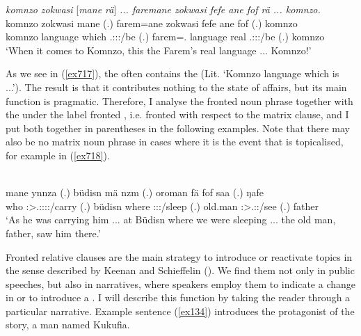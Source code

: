\begin{exe}
	\ex \emph{komnzo zokwasi} [\emph{mane rä}] \emph{... faremane zokwasi fefe ane fof rä ... komnzo.}\\
	\gll komnzo zokwasi mane  (.) farem=ane zokwasi fefe ane fof  (.) komnzo\\
	komnzo language which \Tsg.\F:\Sbj:\Nonpast:\Ipfv/be (.) farem=\Poss.\Sg{} language real \Dem{} \Emph{} \Tsg.\F:\Sbj:\Nonpast:\Ipfv/be (.) komnzo\\
	\trans `When it comes to Komnzo, this the Farem's real language ... Komnzo!'\\
	\label{ex717}
\end{exe}

As we see in (\ref{ex717}), the  often contains the  (Lit. `Komnzo language which is ...'). The result is that it contributes nothing to the state of affairs, but its main function is pragmatic. Therefore, I analyse the fronted noun phrase together with the  under the label fronted , i.e. fronted with respect to the matrix clause, and I put both together in parentheses in the following examples. Note that there may also be no matrix noun phrase in cases where it is the event that is topicalised, for example in (\ref{ex718}).

\begin{exe}
	\\
	\gll mane ynnza (.) büdisn mä nzm (.) oroman fä fof saa (.) ŋafe\\
	who \Sg:\Sbj>\Tsg.\Masc:\Obj:\Pst:\Ipfv:\Venit/carry (.) büdisn where \Fpl:\Sbj:\Pst:\Dur/sleep (.) old.man \Dist{} \Emph{} \Sg:\Sbj>\Tsg.\Masc:\Pst:\Ipfv/see (.) father\\
	\trans `As he was carrying him ... at Büdisn where we were sleeping ... the old man, father, saw him there.'
	\label{ex718}
\end{exe}

Fronted relative clauses are the main strategy to introduce or reactivate topics in the sense described by Keenan and Schieffelin (\citeyear[342]{Keenan:1976wo}). We find them not only in public speeches, but also in narratives, where speakers employ them to indicate a change in  or to introduce a . I will describe this function by taking the reader through a particular narrative. Example sentence (\ref{ex134}) introduces the protagonist of the story, a man named Kukufia.

